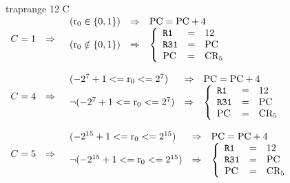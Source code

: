 \begin{instruction}{traprange}\label{inst:traprange}
     {12}
     {\textrm{C}}
     {
       \begin{math}
         \begin{array}{lcl}
           C = 1 & \Rightarrow &
           \begin{array}{lcl}
             (\textrm{r}_{0} \in \lbrace 0, 1 \rbrace) & \Rightarrow & \textrm{PC} = \textrm{PC} + 4 \\
             (\textrm{r}_{0} \notin \lbrace 0, 1 \rbrace) & \Rightarrow &
             \left\lbrace
             \begin{array}{lcl}
               \texttt{R1} & = & 12 \\
               \texttt{R31} & = & \textrm{PC} \\
               \textrm{PC} & = & \textrm{CR}_{5} \\
             \end{array}
             \right. \\
           \end{array} \\

           & & \\

           C = 4 & \Rightarrow &
           \begin{array}{lcl}
             (-2^7 + 1 <= \textrm{r}_{0} <= 2^7) & \Rightarrow & \textrm{PC} = \textrm{PC} + 4 \\
             \neg (-2^7 + 1 <= \textrm{r}_{0} <= 2^7) & \Rightarrow &
             \left\lbrace
             \begin{array}{lcl}
               \texttt{R1} & = & 12 \\
               \texttt{R31} & = & \textrm{PC} \\
               \textrm{PC} & = & \textrm{CR}_{5} \\
             \end{array}
             \right. \\
           \end{array} \\

           & & \\

           C = 5 & \Rightarrow &
           \begin{array}{lcl}
             (-2^{15} + 1 <= \textrm{r}_{0} <= 2^{15}) & \Rightarrow & \textrm{PC} = \textrm{PC} + 4 \\
             \neg (-2^{15} + 1 <= \textrm{r}_{0} <= 2^{15}) & \Rightarrow &
             \left\lbrace
             \begin{array}{lcl}
               \texttt{R1} & = & 12 \\
               \texttt{R31} & = & \textrm{PC} \\
               \textrm{PC} & = & \textrm{CR}_{5} \\
             \end{array}
             \right. \\
           \end{array} \\


\end{array}
\end{math}}
\end{instruction}
